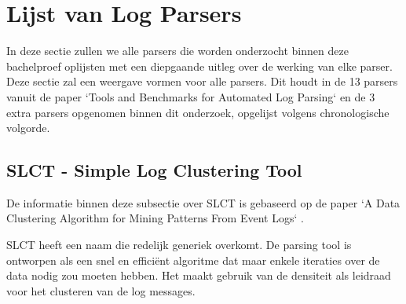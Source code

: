 \section{Lijst van Log Parsers}
In deze sectie zullen we alle parsers die worden onderzocht binnen deze bachelproef oplijsten met een diepgaande uitleg over de werking van elke parser. Deze sectie zal een weergave vormen voor alle parsers. Dit houdt in de 13 parsers vanuit de paper `Tools and Benchmarks for Automated Log Parsing` \autocite{TBA2019} en de 3 extra parsers opgenomen binnen dit onderzoek, opgelijst volgens chronologische volgorde.

\subsection{SLCT - Simple Log Clustering Tool}
De informatie binnen deze subsectie over SLCT is gebaseerd op de paper `A Data Clustering Algorithm for Mining Patterns From Event Logs` \autocite{vaarandi2003data}. 

SLCT heeft een naam die redelijk generiek overkomt. De parsing tool is ontworpen als een snel en efficiënt algoritme dat maar enkele iteraties over de data nodig zou moeten hebben. Het maakt gebruik van de densiteit als leidraad voor het clusteren van de log messages. 

